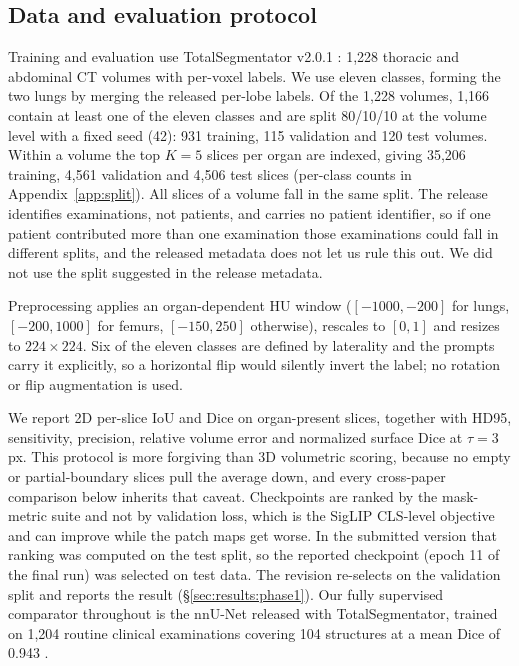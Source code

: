 \documentclass[10pt]{article}
\begin{document}
\subsection{Data and evaluation protocol}
\label{sec:methods:data}

Training and evaluation use TotalSegmentator v2.0.1
\cite{wasserthal2023totalsegdataset}: 1{,}228 thoracic and abdominal CT volumes
with per-voxel labels. We use eleven classes, forming the two lungs by merging the
released per-lobe labels. Of the 1{,}228 volumes, 1{,}166 contain at least one of
the eleven classes and are split 80/10/10 at the volume level with a fixed seed
(42): 931 training, 115 validation and 120 test volumes. Within a volume the top
$K=5$ slices per organ are indexed, giving 35{,}206 training, 4{,}561 validation
and 4{,}506 test slices (per-class counts in Appendix~\ref{app:split}). All slices
of a volume fall in the same split. The release identifies examinations, not
patients, and carries no patient identifier, so if one patient contributed more
than one examination those examinations could fall in different splits, and the released metadata does not let us rule this out. We did not use the split
suggested in the release metadata.

Preprocessing applies an organ-dependent HU window ($[-1000,-200]$ for lungs,
$[-200,1000]$ for femurs, $[-150,250]$ otherwise), rescales to $[0,1]$ and resizes
to $224\times224$. Six of the eleven classes are defined by laterality and the
prompts carry it explicitly, so a horizontal flip would silently invert the label;
no rotation or flip augmentation is used.

We report 2D per-slice IoU and Dice on organ-present slices, together with HD95,
sensitivity, precision, relative volume error and normalized surface Dice
\cite{nikolov2021nsd} at $\tau=3$\,px. This protocol is more forgiving than 3D
volumetric scoring, because no empty or partial-boundary slices pull the average
down, and every cross-paper comparison below inherits that caveat. Checkpoints are
ranked by the mask-metric suite and not by validation loss, which is the SigLIP
CLS-level objective and can improve while the patch maps get worse. In the
submitted version that ranking was computed on the test split, so the reported
checkpoint (epoch 11 of the final run) was selected on test data. The revision
re-selects on the validation split and reports the result
(\S\ref{sec:results:phase1}). Our
fully supervised comparator throughout is the nnU-Net \cite{isensee2021nnunet}
released with TotalSegmentator, trained on 1{,}204 routine clinical examinations
covering 104 structures at a mean Dice of 0.943
\cite{wasserthal2023totalsegmentator}.
\end{document}
